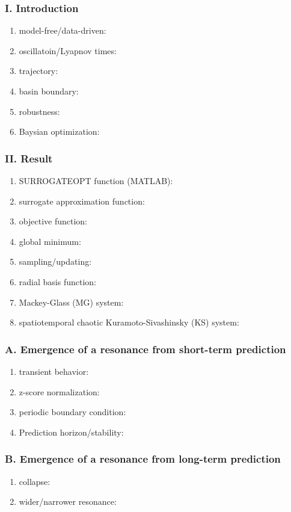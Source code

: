 \subsubsection{I. Introduction}
\begin{enumerate}
  \item model-free/data-driven:
  \item oscillatoin/Lyapnov times:
  \item trajectory:
  \item basin boundary: 
  \item robustness:
  \item Baysian optimization:
\end{enumerate}

\subsubsection{II. Result}
\begin{enumerate}
  \item SURROGATEOPT function (MATLAB):
  \item surrogate approximation function:
  \item objective function:
  \item global minimum:
  \item sampling/updating:
  \item radial basis function: 
  \item Mackey-Glass (MG) system:
  \item spatiotemporal chaotic Kuramoto-Sivashinsky (KS) system: 
\end{enumerate}

\subsubsection{A. Emergence of a resonance from short-term prediction}
\begin{enumerate}
  \item transient behavior:
  \item z-score normalization: 
  \item periodic boundary condition:
  \item Prediction horizon/stability: 
\end{enumerate}

\subsubsection{B. Emergence of a resonance from long-term prediction}
\begin{enumerate}
  \item collapse:
  \item wider/narrower resonance:
\end{enumerate}

